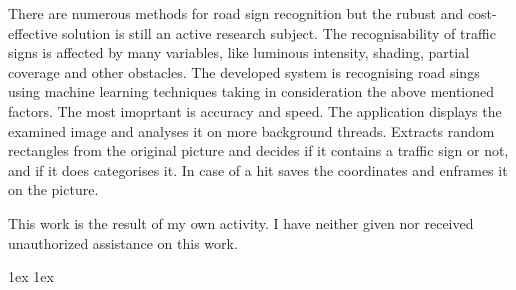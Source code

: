 \documentclass[final]{ubb_dolgozat}
\author{%
Szab\'o \'Agnes-Ter\'ez
}
\begin{document}
\begin{abstractEN} %

\vfill
There are numerous methods for road sign recognition but the rubust and cost-effective solution is still an active research subject. The recognisability of traffic signs is affected by many variables, like luminous intensity, shading, partial coverage and other obstacles. The developed system is recognising road sings using machine learning techniques taking in consideration the above mentioned factors. The most imoprtant is accuracy and speed. The application displays the examined image and analyses it on more background threads. Extracts random rectangles from the original picture and decides if it contains a traffic sign or not, and if it does categorises it. In case of a hit saves the coordinates and enframes it on the picture.

This work is the result of my own activity. I have neither given nor received unauthorized assistance on this work.

\vfill

\end{abstractEN}


\maketitle

{ \baselineskip 1ex
  \parskip 1ex
  \tableofcontents
}


















{


\nocite{*}
}
\end{document}
